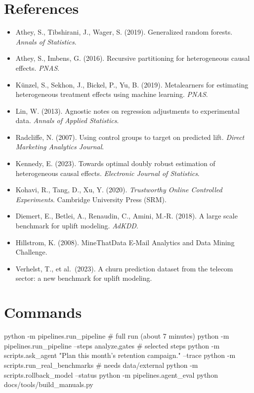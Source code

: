 \documentclass[11pt]{article}
\begin{document}
\section{References}
\begin{itemize}
\item Athey, S., Tibshirani, J., Wager, S. (2019). Generalized random forests. \emph{Annals of Statistics}.
\item Athey, S., Imbens, G. (2016). Recursive partitioning for heterogeneous causal effects. \emph{PNAS}.
\item K\"unzel, S., Sekhon, J., Bickel, P., Yu, B. (2019). Metalearners for estimating heterogeneous treatment effects using machine learning. \emph{PNAS}.
\item Lin, W. (2013). Agnostic notes on regression adjustments to experimental data. \emph{Annals of Applied Statistics}.
\item Radcliffe, N. (2007). Using control groups to target on predicted lift. \emph{Direct Marketing Analytics Journal}.
\item Kennedy, E. (2023). Towards optimal doubly robust estimation of heterogeneous causal effects. \emph{Electronic Journal of Statistics}.
\item Kohavi, R., Tang, D., Xu, Y. (2020). \emph{Trustworthy Online Controlled Experiments}. Cambridge University Press (SRM).
\item Diemert, E., Betlei, A., Renaudin, C., Amini, M.-R. (2018). A large scale benchmark for uplift modeling. \emph{AdKDD}.
\item Hillstrom, K. (2008). MineThatData E-Mail Analytics and Data Mining Challenge.
\item Verhelst, T., et al.\ (2023). A churn prediction dataset from the telecom sector: a new benchmark for uplift modeling.
\end{itemize}

\section{Commands}
\begin{shell}
python -m pipelines.run_pipeline                       # full run (about 7 minutes)
python -m pipelines.run_pipeline --steps analyze,gates # selected steps
python -m scripts.ask_agent "Plan this month's retention campaign." --trace
python -m scripts.run_real_benchmarks                  # needs data/external
python -m scripts.rollback_model --status
python -m pipelines.agent_eval
python docs/tools/build_manuals.py
\end{shell}
\end{document}
